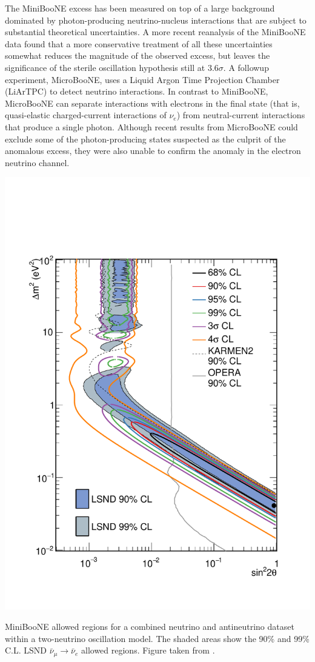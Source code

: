 The MiniBooNE excess has been measured on top of a large background dominated by photon-producing neutrino-nucleus interactions that are subject to substantial theoretical uncertainties.
A more recent reanalysis of the MiniBooNE data found that a more conservative treatment of all these uncertainties somewhat reduces the magnitude of the observed excess, but leaves the significance of the sterile oscillation hypothesis still at $3.6\sigma$\cite{Giunti:2019sag}.
A followup experiment, MicroBooNE\cite{MicroBooNE:2016pwy}, uses a Liquid Argon Time Projection Chamber (LiArTPC) to detect neutrino interactions.
In contrast to MiniBooNE, MicroBooNE can separate interactions with electrons in the final state (that is, quasi-elastic charged-current interactions of $\nu_e$) from neutral-current interactions that produce a single photon.
Although recent results from MicroBooNE could exclude some of the photon-producing states suspected as the culprit of the anomalous excess\cite{MicroBooNE:2021zai}, they were also unable to confirm the anomaly in the electron neutrino channel\cite{MicroBooNE:2022wdf}.
\begin{marginfigure}
    \centering
    \includegraphics{figures/theory/miniboone_fake_apr18_contNunubar_with_karmen_opera.pdf}
    \caption{MiniBooNE allowed regions for a combined neutrino and antineutrino dataset within a two-neutrino oscillation model.  The shaded areas show the 90\% and 99\% C.L. LSND $\bar{\nu}_{\mu}\rightarrow\bar{\nu}_e$ allowed regions. Figure taken from \cite{MiniBooNE:2018esg}.\label{fig:miniboone-lsnd-regions}}
\end{marginfigure}

